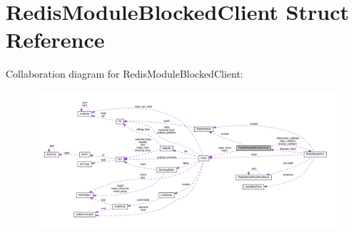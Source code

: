 \hypertarget{struct_redis_module_blocked_client}{}\section{Redis\+Module\+Blocked\+Client Struct Reference}
\label{struct_redis_module_blocked_client}


Collaboration diagram for Redis\+Module\+Blocked\+Client\+:
\nopagebreak
\begin{figure}[H]
\begin{center}
\leavevmode
\includegraphics[width=350pt]{struct_redis_module_blocked_client__coll__graph}
\end{center}
\end{figure}
